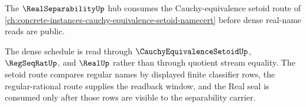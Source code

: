 The $\RealSeparabilityUp$ hub consumes the Cauchy-equivalence setoid route of \autoref{ch:concrete-instances-cauchy-equivalence-setoid-namecert} before dense real-name reads are public.

The dense schedule is read through $\CauchyEquivalenceSetoidUp$, $\RegSeqRatUp$, and $\RealUp$ rather than through quotient stream equality. The setoid route compares regular names by displayed finite classifier rows, the regular-rational route supplies the readback window, and the Real seal is consumed only after those rows are visible to the separability carrier.
